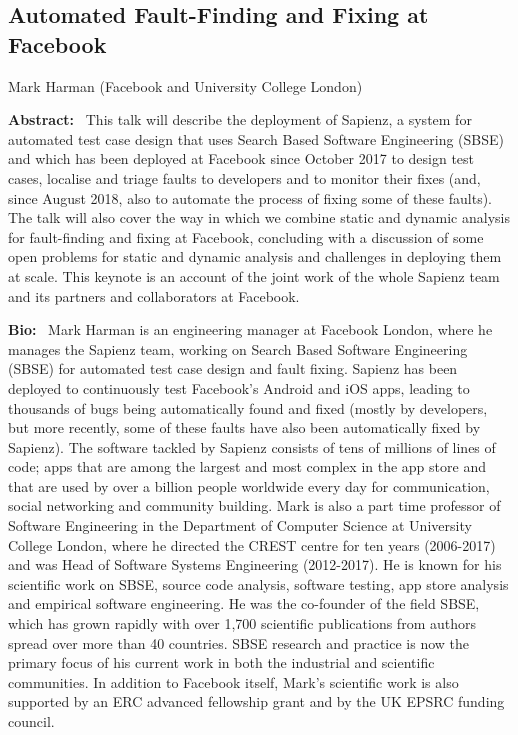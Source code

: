 \label{Keynotes}

\def\talktitle#1{\subsection*{#1}}
\def\speaker#1#2{\begin{flushleft} #1 (#2) \end{flushleft}}
\def\talkabstract{\noindent \textbf{Abstract:}~}
\def\bio{\medskip\noindent \textbf{Bio:}~}

\talktitle{Automated Fault-Finding and Fixing at Facebook}

\speaker{Mark Harman}{Facebook and University College London}

\talkabstract
This talk will describe the deployment of Sapienz, a system for automated test
case design that uses Search Based Software Engineering (SBSE) and which has
been deployed at Facebook since October 2017 to design test cases, localise
and triage faults to developers and to monitor their fixes (and, since August
2018, also to automate the process of fixing some of these faults). The talk
will also cover the way in which we combine static and dynamic analysis for
fault-finding and fixing at Facebook, concluding with a discussion of some
open problems for static and dynamic analysis and challenges in deploying them
at scale. This keynote is an account of the joint work of the whole Sapienz
team and its partners and collaborators at Facebook.

\bio
Mark Harman is an engineering manager at Facebook London, where he manages the
Sapienz team, working on Search Based Software Engineering (SBSE) for
automated test case design and fault fixing. Sapienz has been deployed to
continuously test Facebook’s Android and iOS apps, leading to thousands of
bugs being automatically found and fixed (mostly by developers, but more
recently, some of these faults have also been automatically fixed by
Sapienz). The software tackled by Sapienz consists of tens of millions of
lines of code; apps that are among the largest and most complex in the app
store and that are used by over a billion people worldwide every day for
communication, social networking and community building. Mark is also a part
time professor of Software Engineering in the Department of Computer Science
at University College London, where he directed the CREST centre for ten years
(2006-2017) and was Head of Software Systems Engineering (2012-2017). He is
known for his scientific work on SBSE, source code analysis, software testing,
app store analysis and empirical software engineering. He was the co-founder
of the field SBSE, which has grown rapidly with over 1,700 scientific
publications from authors spread over more than 40 countries. SBSE research
and practice is now the primary focus of his current work in both the
industrial and scientific communities. In addition to Facebook itself, Mark’s
scientific work is also supported by an ERC advanced fellowship grant and by
the UK EPSRC funding council.


